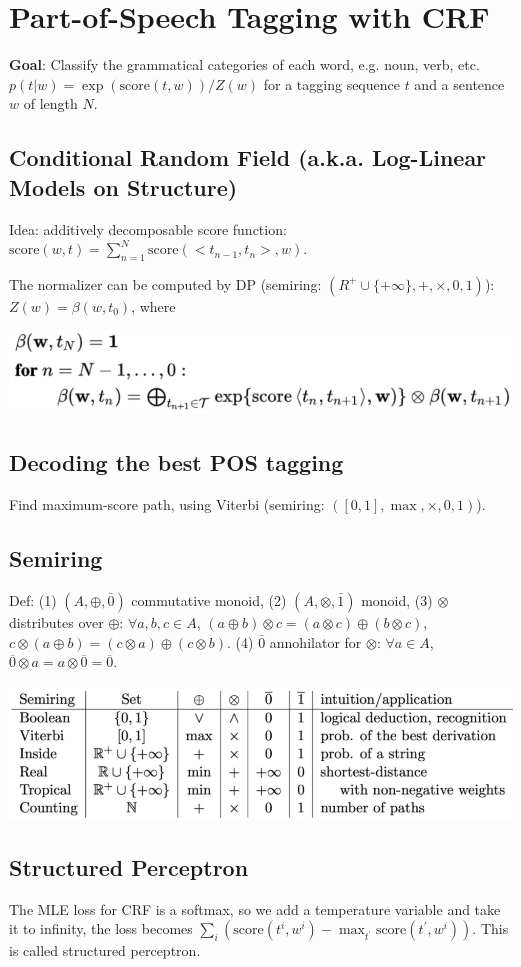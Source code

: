 \section{Part-of-Speech Tagging with CRF}

\textbf{Goal}: Classify the grammatical categories of each word, e.g. noun, verb, etc.
$p(t | w) = \exp(\text{score}(t,w))/{Z(w)}$ for a tagging sequence $t$ and a sentence $w$ of length $N$.

\subsection*{Conditional Random Field (a.k.a. Log-Linear Models on Structure)}

Idea: additively decomposable score function: $\text{score}(w,t) = \sum_{n=1}^{N} \text{score}(<t_{n-1}, t_n>, w)$.

The normalizer can be computed by DP (semiring: $(R^+ \cup \{+\infty\}, +, \times, 0, 1)$): $Z(w) = \beta(w, t_0)$, where
\vspace{-0.3cm}
\begin{center}
    \includegraphics[width=.23\textwidth]{img/CRF-normalizer.png}
\end{center}
\vspace{-0.5cm}

\subsection*{Decoding the best POS tagging}

Find maximum-score path, using Viterbi (semiring: $([0,1], \max, \times, 0, 1)$).

\subsection*{Semiring}

Def: (1) $(A, \oplus, \bar{0})$ commutative monoid, (2) $(A, \otimes, \bar{1})$ monoid, (3) $\otimes$ distributes over $\oplus$: $\forall a,b,c\in A$, $(a \oplus b) \otimes c=(a \otimes c) \oplus(b \otimes c)$,$c \otimes(a \oplus b)=(c \otimes a) \oplus(c \otimes b)$. (4) $\bar{0}$ annohilator for $\otimes$: $\forall a \in A$, $\overline{0} \otimes a=a \otimes \overline{0}=\overline{0}$.

\vspace{-0.5cm}
\begin{center}
    \includegraphics[width=\columnwidth]{img/semiring.png}
\end{center}
\vspace{-0.5cm}
\subsection*{Structured Perceptron}

The MLE loss for CRF is a softmax, so we add a temperature variable and take it to infinity, the loss becomes $\sum_i (\text{score}(t^i, w^i) - \max_{t^\prime} \text{score}(t^\prime, w^i))$. This is called structured perceptron.
